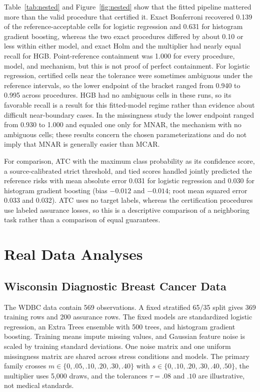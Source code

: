 \documentclass[twoside,11pt]{article}
\begin{document}
Table~\ref{tab:nested} and Figure~\ref{fig:nested} show that the fitted pipeline mattered more
than the valid procedure that certified it. Exact Bonferroni recovered 0.139 of the
reference-acceptable cells for logistic regression and 0.631 for histogram gradient boosting,
whereas the two exact procedures differed by about 0.10 or less within either model, and
exact Holm and the multiplier had nearly equal recall for HGB. Point-reference containment was
1.000 for every procedure, model, and mechanism, but this is not proof of perfect
containment. For logistic regression, certified cells near the tolerance were sometimes
ambiguous under the reference intervals, so the lower endpoint of the bracket ranged from
0.940 to 0.995 across procedures. HGB had no ambiguous cells in these runs, so its favorable
recall is a result for this fitted-model regime rather than evidence about difficult
near-boundary cases. In the missingness study the lower endpoint ranged from 0.930 to 1.000 and
equaled one only for MNAR, the mechanism with no ambiguous cells; these results concern the
chosen parameterizations and do not imply that MNAR is generally easier than MCAR.

For comparison, ATC with the maximum class probability as its confidence score, a
source-calibrated strict threshold, and tied scores handled jointly predicted the reference
risks with mean absolute error 0.031 for logistic regression and 0.030 for histogram gradient
boosting (bias $-0.012$ and $-0.014$; root mean squared error 0.033 and 0.032). ATC uses no
target labels, whereas the certification procedures use labeled assurance losses, so this is
a descriptive comparison of a neighboring task rather than a comparison of equal guarantees.

\section{Real Data Analyses}
\label{sec:realdata}

\subsection{Wisconsin Diagnostic Breast Cancer Data}
\label{sec:wdbc}
The WDBC data contain 569 observations. A fixed stratified 65/35 split gives 369 training
rows and 200 assurance rows. The fixed models are standardized logistic regression, an Extra
Trees ensemble with 500 trees, and histogram gradient boosting. Training means impute missing
values, and Gaussian feature noise is scaled by training standard deviations. One noise matrix
and one uniform missingness matrix are shared across stress conditions and models. The primary
family crosses $m\in\{0,.05,.10,.20,.30,.40\}$ with $s\in\{0,.10,.20,.30,.40,.50\}$, the
multiplier uses 5,000 draws, and the tolerances $\tau=.08$ and $.10$ are illustrative, not
medical standards.
\end{document}
